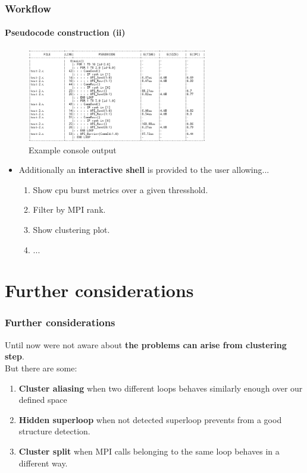 \documentclass{beamer}
\begin{document}
\begin{frame}
\frametitle{Workflow}
\framesubtitle{Pseudocode construction (ii)}
\begin{figure}
	\includegraphics[width=0.7\textwidth]{imgs/console_gui_example_1.png}
	\caption{Example console output}
\end{figure}
\pause
\begin{itemize}
	\item Additionally an \textbf{interactive shell} is provided to the user allowing...
	\begin{enumerate}
		\item Show cpu burst metrics over a given thresshold.
		\item Filter by MPI rank.
		\item Show clustering plot.
		\item ...
	\end{enumerate}
\end{itemize}
\end{frame}

\section{Further considerations}
\begin{frame}
\frametitle{Further considerations}

Until now were not aware about \textbf{the problems can arise from clustering step}. \\
But there are some:
\begin{enumerate}
	\item \textbf{Cluster aliasing} when two different loops behaves similarly enough over our defined space
	\item \textbf{Hidden superloop} when not detected superloop prevents from a good structure detection.
	\item \textbf{Cluster split} when MPI calls belonging to the same loop behaves in a different way.
\end{enumerate}
\vfill
\end{frame}
\end{document}

